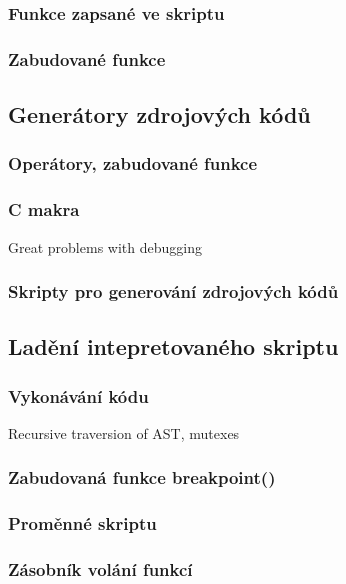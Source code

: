 \documentclass[11pt,twoside,a4paper]{book}
\begin{document}
\subsubsection{Funkce zapsané ve skriptu}

\subsubsection{Zabudované funkce}


\subsection{Generátory zdrojových kódů}

\subsubsection{Operátory, zabudované funkce}

\subsubsection{C makra}
Great problems with debugging

\subsubsection{Skripty pro generování zdrojových kódů}


\subsection{Ladění intepretovaného skriptu}

\subsubsection{Vykonávání kódu}

Recursive traversion of AST, mutexes


\subsubsection{Zabudovaná funkce breakpoint()}

\subsubsection{Proměnné skriptu}

\subsubsection{Zásobník volání funkcí}
\end{document}
